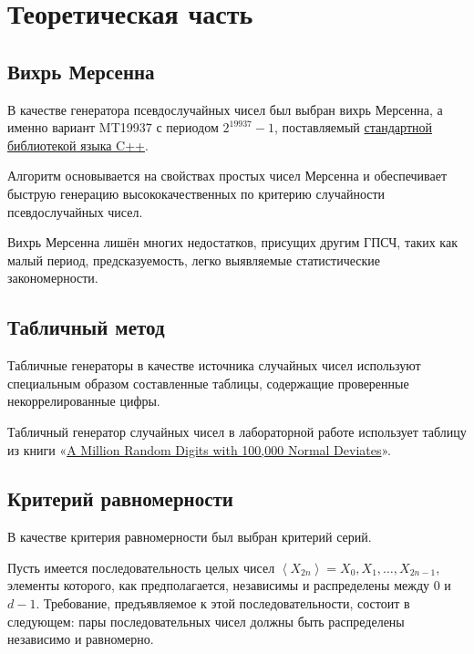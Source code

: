 \documentclass[a4paper,oneside,12pt]{extreport}
\begin{document}


\tableofcontents

\chapter{Теоретическая часть}

\section{Вихрь Мерсенна}

В качестве генератора псевдослучайных чисел был выбран вихрь Мерсенна, а именно вариант MT19937 с периодом $2^{19937} - 1$, поставляемый \href{https://en.cppreference.com/w/cpp/numeric/random/mersenne_twister_engine}{стандартной библиотекой языка C++}.

Алгоритм основывается на свойствах простых чисел Мерсенна и обеспечивает быструю генерацию высококачественных по критерию случайности псевдослучайных чисел.

Вихрь Мерсенна лишён многих недостатков, присущих другим ГПСЧ, таких как малый период, предсказуемость, легко выявляемые статистические закономерности.

\section{Табличный метод}

Табличные генераторы в качестве источника случайных чисел используют специальным образом составленные таблицы, содержащие проверенные некоррелированные цифры.

Табличный генератор случайных чисел в лабораторной работе использует таблицу из книги «\href{https://www.rand.org/pubs/monograph_reports/MR1418.html}{A Million Random Digits with 100,000 Normal Deviates}».

\section{Критерий равномерности}

В качестве критерия равномерности был выбран критерий серий.

Пусть имеется последовательность целых чисел $\left<X_{2n}\right> = X_0, X_1, \ldots, X_{2n - 1}$, элементы которого, как предполагается, независимы и распределены между $0$ и $d - 1$.
Требование, предъявляемое к этой последовательности, состоит в следующем: пары последовательных чисел должны быть распределены независимо и равномерно.
\end{document}
